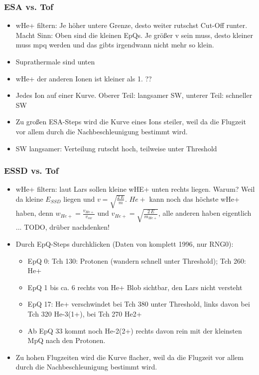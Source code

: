 \documentclass[]{article}
\begin{document}
\subsubsection{ESA vs. Tof}
\begin{itemize}
	\item wHe+ filtern: Je höher untere Grenze, desto weiter rutschst Cut-Off runter. Macht Sinn: Oben sind die kleinen EpQs. Je größer v sein muss, desto kleiner muss mpq werden und das gibts irgendwann nicht mehr so klein.
	\item Suprathermale sind unten
	\item wHe+ der anderen Ionen ist kleiner als 1. ??
	\item Jedes Ion auf einer Kurve. Oberer Teil: langsamer SW, unterer Teil: schneller SW
	\item Zu großen ESA-Steps wird die Kurve eines Ions steiler, weil da die Flugzeit vor allem durch die Nachbeschleunigung bestimmt wird. 
	\item SW langsamer: Verteilung rutscht hoch, teilweise unter Threshold
\end{itemize}
\subsubsection{ESSD vs. Tof}
\begin{itemize}
	\item wHe+ filtern: laut Lars sollen kleine wHE+ unten rechts liegen. Warum? Weil da kleine $E_{SSD}$ liegen und $v = \sqrt{\frac{2\,E}{m}}$. $He+$ kann noch das höchste wHe+ haben, denn $w_{He+} = \frac{v_{He+}}{v_{sw}}$ und $v_{He+} = \sqrt{\frac{2\,E}{m_{He+}}}$, alle anderen haben eigentlich ... TODO, drüber nachdenken!
	\item Durch EpQ-Steps durchklicken (Daten von komplett 1996, nur RNG0): 
	\begin{itemize}
		\item EpQ 0: Tch 130: Protonen (wandern schnell unter Threshold); Tch 260: He+
		\item EpQ 1 bis ca. 6 rechts von He+ Blob sichtbar, den Lars nicht versteht
		\item EpQ 17: He+ verschwindet bei Tch 380 unter Threshold, links davon bei Tch 320 He-3(1+), bei Tch 270 He2+
		\item Ab EpQ 33 kommt noch He-2(2+) rechts davon rein mit der kleinsten MpQ nach den Protonen.
	\end{itemize}
	\item Zu hohen Flugzeiten wird die Kurve flacher, weil da die Flugzeit vor allem durch die Nachbeschleunigung bestimmt wird.
	  
\end{itemize}
\end{document}
